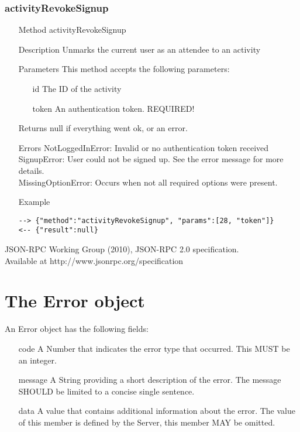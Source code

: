 \documentclass[a4paper]{scrreprt}
\begin{document}
\subsection{activityRevokeSignup}
\begin{enumerate}
\item[Method] activityRevokeSignup
\item[Description] Unmarks the current user as an attendee to an activity
\item[Parameters] This method accepts the following parameters:
	\begin{enumerate}
		\item[id] The ID of the activity
        \item[token] An authentication token. REQUIRED!
    \end{enumerate}
\item[Returns] null if everything went ok, or an error.
\item[Errors] 
	NotLoggedInError: Invalid or no authentication token received \\
	SignupError: User could not be signed up. See the error message for more details. \\
    MissingOptionError: Occurs when not all required options were present.
\item[Example]
\begin{lstlisting}
--> {"method":"activityRevokeSignup", "params":[28, "token"]}
<-- {"result":null}
\end{lstlisting}
\end{enumerate}


\begin{thebibliography}{9}

	JSON-RPC Working Group (2010), JSON-RPC 2.0 specification.\\ Available at http://www.jsonrpc.org/specification

\end{thebibliography}


\appendix
\chapter{The Error object}\label{sec:errordict}
An Error object has the following fields\cite{jsonrpc}:
\begin{enumerate}
\item[code]
A Number that indicates the error type that occurred.
This MUST be an integer.
\item[message]
A String providing a short description of the error.
The message SHOULD be limited to a concise single sentence.
\item[data]
A value that contains additional information about the error. The value of this member is defined by the Server, this member MAY be omitted.
\end{enumerate}
\end{document}

